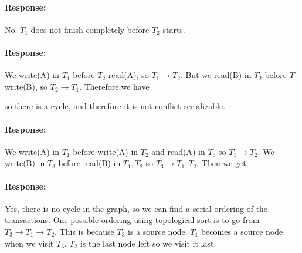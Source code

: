 \documentclass{report}
\begin{document}
\vspace{2em}

\paragraph{Response:}
No. $T_1$ does not finish completely before $T_2$ starts.
\vspace{2em}

\paragraph{Response:}
We write(A) in $T_1$ before $T_2$ read(A), so $T_1 \to T_2$. But we read(B)
in $T_2$ before $T_1$ write(B), so $T_2 \to T_1$. Therefore,we have

{
    \centering
    \par
}

so there is a cycle, and therefore it is not conflict serializable.
\vspace{2em}

\paragraph{Response:}
We write(A) in $T_1$ before write(A) in $T_2$ and read(A) in $T_3$ so $T_1 \to T_2$.
We write(B) in $T_3$ before read(B) in $T_1, T_2$ so $T_3 \to T_1, T_2$.
Then we get

{
    \centering
    \par
}
\vspace{2em}

\paragraph{Response:}
Yes, there is no cycle in the graph, so we can find a serial ordering of the
transactions. One possible ordering using topological sort is to go from $T_3
\to T_1 \to T_2$. This is because $T_3$ is a source node. $T_1$ becomes a source
node when we visit $T_3$. $T_2$ is the last node left so we visit it last.
\end{document}
